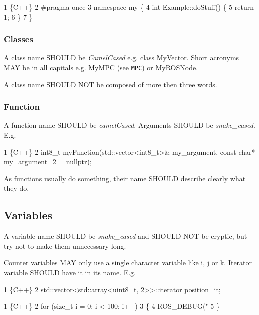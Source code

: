 \begin{DoxyCode}
1 \{C++\}
2 #pragma once
3 namespace my \{
4     int Example::doStuff() \{
5         return 1;
6     \}
7 \}
\end{DoxyCode}


\subsubsection*{Classes}

A class name S\+H\+O\+U\+LD be {\itshape Camel\+Cased} e.\+g. {\ttfamily class My\+Vector}. Short acronyms M\+AY be in all capitals e.\+g. {\ttfamily My\+M\+PC} (see \href{https://en.wikipedia.org/wiki/Model_predictive_control}{\tt M\+PC}) or {\ttfamily My\+R\+O\+S\+Node}.

A class name S\+H\+O\+U\+LD N\+OT be composed of more then three words.

\subsubsection*{Function}

A function name S\+H\+O\+U\+LD be {\itshape camel\+Cased}. Arguments S\+H\+O\+U\+LD be {\itshape snake\+\_\+cased}. E.\+g. 
\begin{DoxyCode}
1 \{C++\}
2 int8\_t myFunction(std::vector<int8\_t>& my\_argument, const char* my\_argument\_2 = nullptr);
\end{DoxyCode}


As functions usually do something, their name S\+H\+O\+U\+LD describe clearly what they do.

\subsection*{Variables}

A variable name S\+H\+O\+U\+LD be {\itshape snake\+\_\+cased} and S\+H\+O\+U\+LD N\+OT be cryptic, but try not to make them unnecessary long.

Counter variables M\+AY only use a single character variable like {\ttfamily i}, {\ttfamily j} or {\ttfamily k}. Iterator variable S\+H\+O\+U\+LD have {\ttfamily it} in its name. E.\+g. 
\begin{DoxyCode}
1 \{C++\}
2 std::vector<std::array<uint8\_t, 2>>::iterator position\_it;
\end{DoxyCode}
 
\begin{DoxyCode}
1 \{C++\}
2 for (size\_t i = 0; i < 100; i++)
3 \{
4     ROS\_DEBUG("%
5 \}
\end{DoxyCode}


